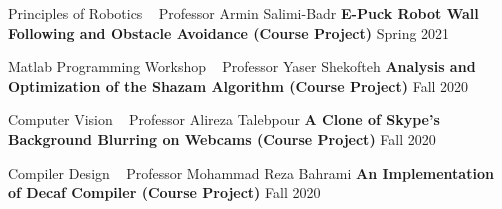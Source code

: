   \begin{cventries}
    
    \cventry
    {Principles of Robotics ~ Professor Armin Salimi-Badr}
    {\textbf {E-Puck Robot Wall Following and Obstacle Avoidance (Course Project)}}
    {}
    {Spring 2021}
    {}
    \vspace{0.0 cm}
  \end{cventries}
  \begin{cventries}
    
    \cventry
    {Matlab Programming Workshop ~ Professor Yaser Shekofteh}
    {\textbf {Analysis and Optimization of the Shazam Algorithm (Course Project)}}
    {}
    {Fall 2020}
    {}
    \vspace{0.0 cm}
  \end{cventries}
  \begin{cventries}
    
    \cventry
    {Computer Vision ~ Professor Alireza Talebpour}
    {\textbf {A Clone of Skype's Background Blurring on Webcams (Course Project)}}
    {}
    {Fall 2020}
    {}
    \vspace{0.0 cm}
  \end{cventries}
  \begin{cventries}

    \cventry
    {Compiler Design ~ Professor Mohammad Reza Bahrami}
    {\textbf {An Implementation of Decaf Compiler (Course Project)}}
    {}
    {Fall 2020}
    {}
    \vspace{0.0 cm}
  \end{cventries}
